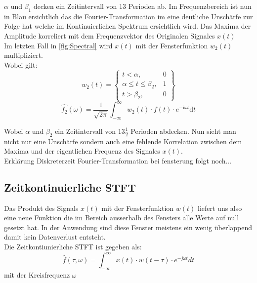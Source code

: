 $\alpha$ und $\beta_{1}$ decken ein Zeitintervall von $13$ Perioden ab. Im Frequenzbereich ist nun in Blau ersichtlich das die Fourier-Transformation im eine deutliche Unschärfe zur Folge hat welche im Kontinuierlichen Spektrum ersichtlich wird. Das Maxima der Amplitude korreliert mit dem Frequenzvektor des Originalen Signales $x(t)$\\




Im letzten Fall in \ref{fig:Spectral} wird $x(t)$ mit der Fensterfunktion $w_{2}(t)$ multipliziert.\\
Wobei gilt: 
\begin{equation}
	w_{2}(t)= \left\{\begin{array}{lll}{t<\alpha,} & {0} \\ {\alpha\leq t \leq\beta_{2},} & {1}\\ {t>\beta_{2},}&{0}\end{array}\right\}
\end{equation}
\begin{equation}
	\hat{f_{2}}(\omega)=\frac{1}{\sqrt{2 \pi}} \int_{-\infty}^{\infty} w_{2}(t)\cdot f(t) \cdot e^{-\mathrm{i} \omega t} \mathrm{d} t
\end{equation}

Wobei $\alpha$ und $\beta_{2}$ ein Zeitintervall von $13\frac{1}{2}$ Perioden abdecken. Nun sieht man nicht nur eine Unschärfe sondern auch eine fehlende Korrelation zwischen dem Maxima und der eigentlichen Frequenz des Signales $x(t)$.\\


Erklärung Diskreterzeit Fourier-Transformation bei fensterung folgt noch...\\


\subsection{Zeitkontinuierliche STFT}

Das Produkt des Signals $x(t)$ mit der Fensterfunktion $w(t) $ liefert uns also eine neue Funktion die im Bereich ausserhalb des Fensters alle Werte auf null gesetzt hat. In der Anwendung sind diese Fenster meistens ein wenig überlappend damit kein Datenverlust entsteht. \\
Die Zeitkontiunierliche STFT ist  gegeben als:
\begin{equation}
	\hat{f}(\tau, \omega)=\int_{-\infty}^{\infty} x(t)\cdot w(t-\tau)\cdot e^{-j \omega t} dt
\end{equation}
mit der Kreisfrequenz  $\omega $

